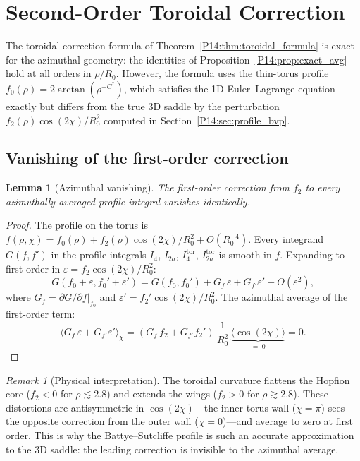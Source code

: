 \documentclass[11pt,a4paper]{article}
\newtheorem{lemma}[theorem]{Lemma}
\theoremstyle{definition}
\theoremstyle{remark}
\newtheorem{remark}[theorem]{Remark}
\newcommand{\Cstar}{C^*}
\newcommand{\fzero}{f_0}
\newcommand{\ftwo}{f_2}
\newcommand{\Rzero}{R_0}
\newcommand{\Itor}[1]{I_{#1}^{\mathrm{tor}}}
\begin{document}
\section{Second-Order Toroidal Correction}
\label{P14:sec:second_order}

The toroidal correction formula of Theorem~\ref{P14:thm:toroidal_formula}
is exact for the azimuthal geometry: the identities of
Proposition~\ref{P14:prop:exact_avg} hold at all orders in $\rho/\Rzero$.
However, the formula uses the thin-torus profile
$\fzero(\rho)=2\arctan(\rho^{-\Cstar})$, which satisfies the 1D
Euler--Lagrange equation exactly but differs from the true 3D saddle
by the perturbation $\ftwo(\rho)\cos(2\chi)/\Rzero^2$ computed in
Section~\ref{P14:sec:profile_bvp}.

\subsection{Vanishing of the first-order correction}

\begin{lemma}[Azimuthal vanishing]
\label{P14:lem:first_order_vanish}
The first-order correction from $\ftwo$ to every azimuthally-averaged
profile integral vanishes identically.
\end{lemma}

\begin{proof}
The profile on the torus is
$f(\rho,\chi) = \fzero(\rho) + \ftwo(\rho)\cos(2\chi)/\Rzero^2
+ O(\Rzero^{-4})$.
Every integrand $G(f,f')$ in the profile integrals $I_4$, $I_{2a}$,
$\Itor{4}$, $\Itor{2a}$ is smooth in $f$.
Expanding to first order in $\varepsilon = \ftwo\cos(2\chi)/\Rzero^2$:
\begin{equation}
  G(\fzero+\varepsilon, \fzero'+\varepsilon')
  = G(\fzero,\fzero') + G_f\,\varepsilon + G_{f'}\varepsilon'
  + O(\varepsilon^2),
\end{equation}
where $G_f = \partial G/\partial f|_{\fzero}$ and
$\varepsilon' = \ftwo'\cos(2\chi)/\Rzero^2$.
The azimuthal average of the first-order term:
\begin{equation}
  \bigl\langle G_f\,\varepsilon + G_{f'}\varepsilon'\bigr\rangle_\chi
  = (G_f\,\ftwo + G_{f'}\ftwo')\,\frac{1}{\Rzero^2}\,
    \underbrace{\langle\cos(2\chi)\rangle}_{=\;0}
  = 0.
  \label{P14:eq:first_order_vanish}
\end{equation}
\end{proof}

\begin{remark}[Physical interpretation]
\label{P14:rem:curvature_flattening}
The toroidal curvature flattens the Hopfion core ($\ftwo < 0$ for
$\rho\lesssim 2.8$) and extends the wings ($\ftwo > 0$ for
$\rho\gtrsim 2.8$).  These distortions are antisymmetric in
$\cos(2\chi)$---the inner torus wall ($\chi=\pi$) sees the opposite
correction from the outer wall ($\chi=0$)---and average to zero at
first order.  This is why the Battye--Sutcliffe profile is such an
accurate approximation to the 3D saddle: the leading correction is
invisible to the azimuthal average.
\end{remark}
\end{document}
